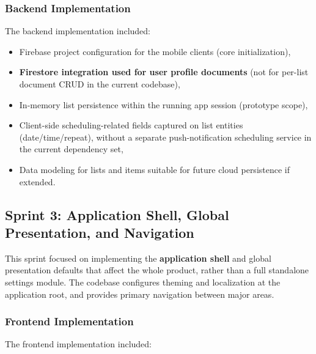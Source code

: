 \subsubsection{Backend Implementation}

The backend implementation included:

\begin{itemize}
    \item Firebase project configuration for the mobile clients (core initialization),
    \item \textbf{Firestore integration used for user profile documents} (not for per-list document CRUD in the current codebase),
    \item In-memory list persistence within the running app session (prototype scope),
    \item Client-side scheduling-related fields captured on list entities (date/time/repeat), without a separate push-notification scheduling service in the current dependency set,
    \item Data modeling for lists and items suitable for future cloud persistence if extended.
\end{itemize}

\subsection{Sprint 3: Application Shell, Global Presentation, and Navigation}

This sprint focused on implementing the \textbf{application shell} and global presentation
defaults that affect the whole product, rather than a full standalone settings module.
The codebase configures theming and localization at the application root, and provides
primary navigation between major areas.

\subsubsection{Frontend Implementation}

The frontend implementation included:

